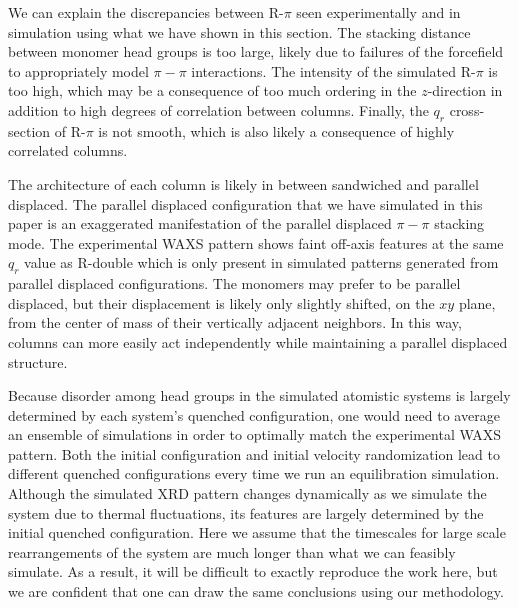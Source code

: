 \documentclass[journal=jpcbfk,manuscript=article]{achemso}
\begin{document}
  We can explain the discrepancies between R-$\pi$ seen experimentally
  and in simulation using what we have shown in this section. The stacking
  distance between monomer head groups is too large, likely due to failures
  of the forcefield to appropriately model $\pi-\pi$ interactions. The intensity
  of the simulated R-$\pi$ is too high, which may be a consequence of too much
  ordering in the $z$-direction in addition to high degrees of correlation 
  between columns. Finally, the $q_r$ cross-section of R-$\pi$ is not smooth, 
  which is also likely a consequence of highly correlated columns. 
  
  The architecture of each column is likely in between sandwiched and parallel
  displaced. The parallel displaced configuration that we have simulated in this
  paper is an exaggerated manifestation of the parallel displaced $\pi-\pi$
  stacking mode. The experimental WAXS pattern shows faint off-axis features at the
  same $q_r$ value as R-double which is only present in simulated patterns generated from
  parallel displaced configurations. The monomers may prefer to be parallel displaced, but
  their displacement is likely only slightly shifted, on the $xy$ plane, from the
  center of mass of their vertically adjacent neighbors. In this way, columns can
  more easily act independently while maintaining a parallel displaced structure. 
  
  Because disorder among head groups in the simulated atomistic systems is largely
  determined by each system's quenched configuration, one would need to average an
  ensemble of simulations in order to optimally match the experimental WAXS pattern. 
  Both the initial configuration and initial velocity randomization lead to 
  different quenched configurations every time we run an equilibration simulation.
  Although the simulated XRD pattern changes dynamically as we simulate the system
  due to thermal fluctuations, its features are largely determined by the initial 
  quenched configuration. Here we assume that the timescales for large scale 
  rearrangements of the system are much longer than what we can feasibly simulate. 
  As a result, it will be difficult to exactly reproduce the work here, but we are
  confident that one can draw the same conclusions using our methodology. 
  
\end{document}
